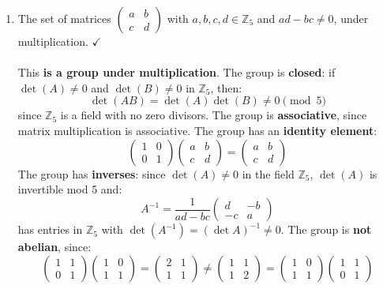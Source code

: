 \documentclass{article}
\newcommand{\Zn}[1]{\mathbb{Z}_{#1}}
\begin{document}
\begin{enumerate}
\begin{enumerate}
            \item The set of matrices $\begin{pmatrix} a & b \\ c & d \end{pmatrix}$ with $a,b,c,d \in \Zn{5}$ and $ad-bc \neq 0$, under multiplication. $\checkmark$
            \\
            \\ This \textbf{is a group under multiplication}. The group is \textbf{closed}: if $\det(A)\neq 0$ and $\det(B)\neq 0$ in $\Zn{5}$, then:
            \[
                \det(AB) = \det(A)\det(B) \neq 0 \pmod{5}
            \]
            since $\Zn{5}$ is a field with no zero divisors. The group is \textbf{associative}, since matrix multiplication is associative. The group has an \textbf{identity element}:
            \[
                \begin{pmatrix} 1 & 0 \\ 0 & 1 \end{pmatrix}\begin{pmatrix} a & b \\ c & d \end{pmatrix}
                = \begin{pmatrix} a & b \\ c & d \end{pmatrix}
            \]
            The group has \textbf{inverses}: since $\det(A)\neq 0$ in the field $\Zn{5}$, $\det(A)$ is invertible mod 5 and:
            \[
                A^{-1} = \frac{1}{ad-bc}\begin{pmatrix} d & -b \\ -c & a \end{pmatrix}
            \]
            has entries in $\Zn{5}$ with $\det(A^{-1}) = (\det A)^{-1} \neq 0$. The group is \textbf{not abelian}, since:
            \[
                \begin{pmatrix} 1 & 1 \\ 0 & 1 \end{pmatrix}\begin{pmatrix} 1 & 0 \\ 1 & 1 \end{pmatrix}
                = \begin{pmatrix} 2 & 1 \\ 1 & 1 \end{pmatrix}
                \neq
                \begin{pmatrix} 1 & 1 \\ 1 & 2 \end{pmatrix}
                = \begin{pmatrix} 1 & 0 \\ 1 & 1 \end{pmatrix}\begin{pmatrix} 1 & 1 \\ 0 & 1 \end{pmatrix}
            \]


\end{enumerate}
\end{enumerate}
\end{document}
